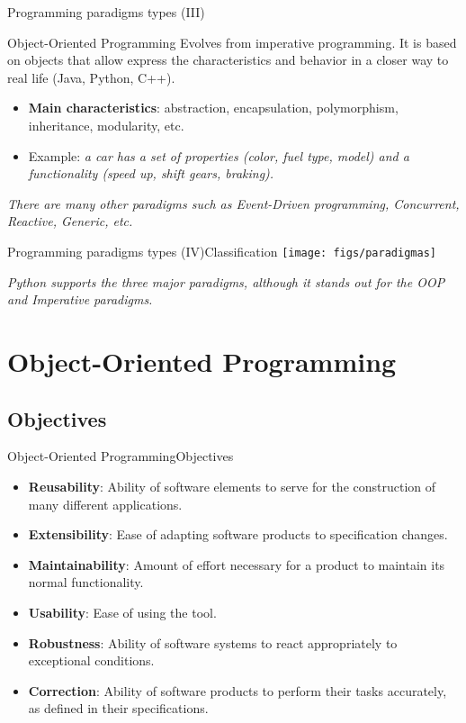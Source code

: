 \documentclass[10pt,compress]{beamer} %
\begin{document}
\begin{frame}{Programming paradigms types (III)}{}
	\begin{block}{Object-Oriented Programming}
		Evolves from imperative programming. It is based on \alert{objects} that allow express the \alert{characteristics} and \alert{behavior} in a closer way to real life (Java, Python, C++). 
  	\end{block}
  	\begin{itemize}
  		\item \textbf{Main characteristics}: abstraction, encapsulation, polymorphism, inheritance, modularity, etc.
		\item Example: \textit{a car has a set of properties (color, fuel type, model) and a functionality (speed up, shift gears, braking).} 
  	\end{itemize}
  	
\textit{\alert{There are many other paradigms such as Event-Driven programming, Concurrent, Reactive, Generic, etc.}}
\end{frame}

\begin{frame}{Programming paradigms types (IV)}{Classification}
	\texttt{[image: figs/paradigmas]}
	
	\centering\textit{\alert{Python supports the three major paradigms, although it stands out for the OOP and Imperative paradigms.}
}\end{frame}

\section[Object-Oriented Programming]{Object-Oriented Programming}

\subsection{Objectives}

\begin{frame}{Object-Oriented Programming}{Objectives}
\begin{itemize}
  	\item \textbf{Reusability}: Ability of software elements to serve for the construction of many different applications.
  	\item \textbf{Extensibility}: Ease of adapting software products to specification changes.
  	\item \textbf{Maintainability}: Amount of effort necessary for a product to maintain its normal functionality.   
  	\item \textbf{Usability}: Ease of using the tool.
  	\item \textbf{Robustness}: Ability of software systems to react appropriately to exceptional conditions.   
  	\item \textbf{Correction}: Ability of software products to perform their tasks accurately, as defined in their specifications.
  	\end{itemize} 	
\end{frame}
\end{document}
